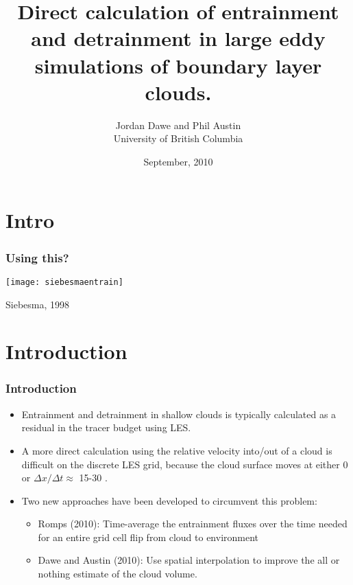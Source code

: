 \documentclass[fleqn,hyperref={colorlinks=true,linkcolor=blue,urlcolor=blue},numbers]{beamer}
\begin{document}
\author{Jordan Dawe and Phil Austin\\
University of British Columbia} 
\title{Direct calculation of entrainment and detrainment in 
large eddy simulations
of boundary layer clouds.}
\date{September, 2010} 



\frame{\titlepage
} 


\section{Intro}


\begin{frame}
  \frametitle{Using this?}
\texttt{[image: siebesmaentrain]}
\par
\small
Siebesma, 1998
\normalsize
\end{frame}



\section{Introduction}

\begin{frame}
  \frametitle{Introduction}

  \begin{itemize}

  \item Entrainment and detrainment in shallow clouds is  typically calculated as a
residual in the tracer budget using LES. \pause

\item A more direct calculation using the relative velocity into/out of a cloud
is difficult on the discrete LES grid, because
the cloud surface moves at either 0 or $\Delta x/\Delta t \approx $ 15-30 . \pause

\item Two new approaches have been developed to circumvent this problem:  \pause

  \begin{itemize}
  \item Romps (2010):  Time-average the entrainment fluxes over the time needed for an entire
grid cell flip from cloud to environment \pause
\item Dawe and Austin (2010):  Use spatial interpolation to improve the all or nothing estimate
of the cloud volume.
  \end{itemize}

     
  \end{itemize}
\end{frame}
\end{document}
